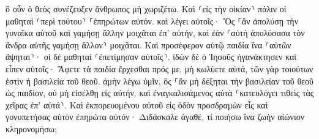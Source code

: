 \documentclass{openreader}
\begin{document}
ὃ οὖν ὁ θεὸς συνέζευξεν ἄνθρωπος μὴ χωριζέτω. 
Καὶ ⸂εἰς τὴν οἰκίαν⸃ πάλιν οἱ μαθηταὶ ⸂περὶ τούτου⸃ ⸀ἐπηρώτων αὐτόν. 
καὶ λέγει αὐτοῖς· Ὃς ⸀ἂν ἀπολύσῃ τὴν γυναῖκα αὐτοῦ καὶ γαμήσῃ ἄλλην μοιχᾶται ἐπ’ αὐτήν, 
καὶ ἐὰν ⸂αὐτὴ ἀπολύσασα τὸν ἄνδρα αὐτῆς γαμήσῃ ἄλλον⸃ μοιχᾶται. 
Καὶ προσέφερον αὐτῷ παιδία ἵνα ⸂αὐτῶν ἅψηται⸃· οἱ δὲ μαθηταὶ ⸂ἐπετίμησαν αὐτοῖς⸃. 
ἰδὼν δὲ ὁ Ἰησοῦς ἠγανάκτησεν καὶ εἶπεν αὐτοῖς· Ἄφετε τὰ παιδία ἔρχεσθαι πρός με, μὴ κωλύετε αὐτά, τῶν γὰρ τοιούτων ἐστὶν ἡ βασιλεία τοῦ θεοῦ. 
ἀμὴν λέγω ὑμῖν, ὃς ⸀ἂν μὴ δέξηται τὴν βασιλείαν τοῦ θεοῦ ὡς παιδίον, οὐ μὴ εἰσέλθῃ εἰς αὐτήν. 
καὶ ἐναγκαλισάμενος αὐτὰ ⸂κατευλόγει τιθεὶς τὰς χεῖρας ἐπ’ αὐτά⸃. 
Καὶ ἐκπορευομένου αὐτοῦ εἰς ὁδὸν προσδραμὼν εἷς καὶ γονυπετήσας αὐτὸν ἐπηρώτα αὐτόν· Διδάσκαλε ἀγαθέ, τί ποιήσω ἵνα ζωὴν αἰώνιον κληρονομήσω; 
\end{document}
